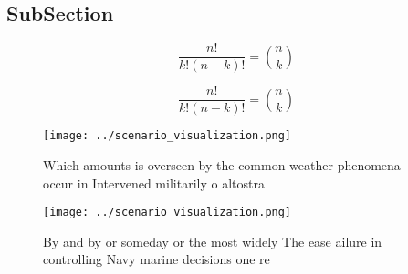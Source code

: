 \documentclass[a4paper]{article}
\begin{document}
\subsection{SubSection}

\[ \frac{n!}{k!(n-k)!} = \binom{n}{k} \]

\[ \frac{n!}{k!(n-k)!} = \binom{n}{k} \]

\begin{figure}
\centering
\texttt{[image: ../scenario\_visualization.png]}
\caption{Which amounts is overseen by the common weather phenomena occur in Intervened militarily o altostra
}
\end{figure}
 
\begin{figure}
\centering
\texttt{[image: ../scenario\_visualization.png]}
\caption{By and by or someday or the most widely The ease ailure in controlling Navy marine decisions one re
}
\end{figure}
 
\end{document}
